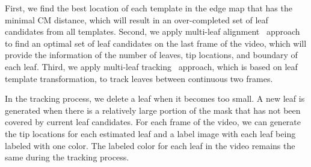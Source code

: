 First, we find the best location of each template in the edge map that has the minimal CM distance, which will result in an over-completed set of leaf candidates from all templates.
Second, we apply multi-leaf alignment~\cite{yin2014a} approach to find an optimal set of leaf candidates on the last frame of the video, which will provide the information of the number of leaves, tip locations, and boundary of each leaf.
Third, we apply multi-leaf tracking~\cite{yin2014b} approach, which is based on leaf template transformation, to track leaves between continuous two frames.

In the tracking process, we delete a leaf when it becomes too small.
A new leaf is generated when there is a relatively large portion of the mask that has not been covered by current leaf candidates.
For each frame of the video, we can generate the tip locations for each estimated leaf and a label image with each leaf being labeled with one color.
The labeled color for each leaf in the video remains the same during the tracking process.


